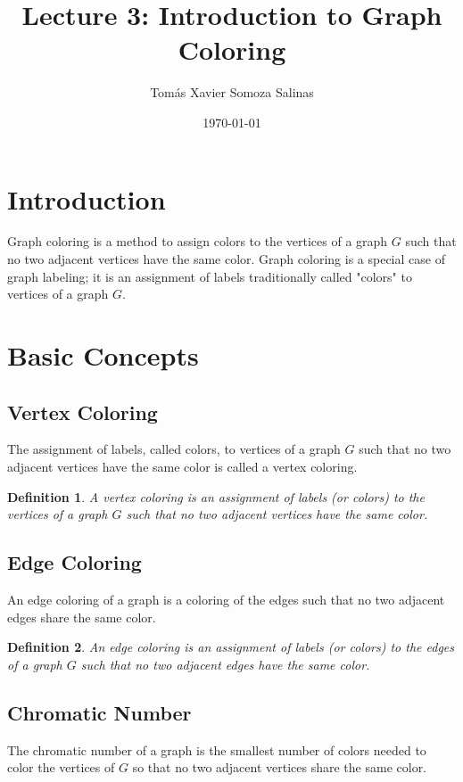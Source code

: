 \documentclass{article}
\newtheorem{definition}{Definition}
\begin{document}
	
	\title{Lecture 3: Introduction to Graph Coloring}
	\author{Tomás Xavier Somoza Salinas}
	\date{\today}
	\maketitle
	
	\section{Introduction}
	Graph coloring is a method to assign colors to the vertices of a graph \(G\) such that no two adjacent vertices have the same color. Graph coloring is a special case of graph labeling; it is an assignment of labels traditionally called "colors" to vertices of a graph \(G\).
	
	\section{Basic Concepts}
	
	\subsection{Vertex Coloring}
	The assignment of labels, called colors, to vertices of a graph \(G\) such that no two adjacent vertices have the same color is called a vertex coloring.
	
	\begin{definition}
		A \textit{vertex coloring} is an assignment of labels (or colors) to the vertices of a graph \(G\) such that no two adjacent vertices have the same color.
	\end{definition}
	
	\subsection{Edge Coloring}
	An edge coloring of a graph is a coloring of the edges such that no two adjacent edges share the same color.
	
	\begin{definition}
		An \textit{edge coloring} is an assignment of labels (or colors) to the edges of a graph \(G\) such that no two adjacent edges have the same color.
	\end{definition}
	
\subsection{Chromatic Number}
The chromatic number of a graph is the smallest number of colors needed to color the vertices of \(G\) so that no two adjacent vertices share the same color.
\end{document}
